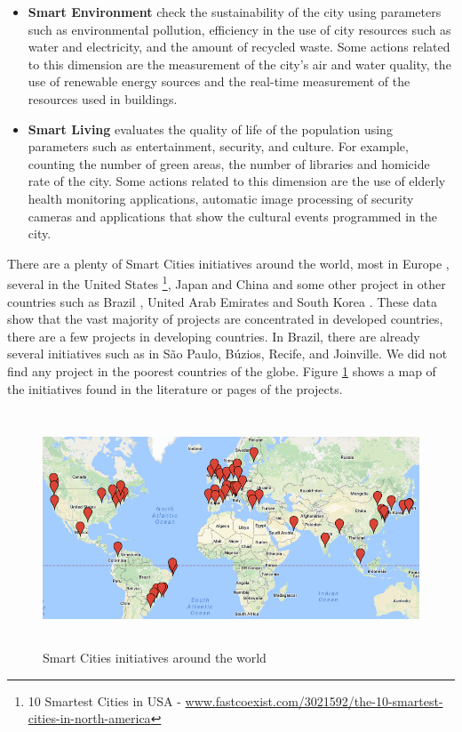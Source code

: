 \begin{itemize}
    \item \textbf{Smart Environment} check the sustainability of the city using parameters such as environmental pollution, efficiency in the use of city resources such as water and electricity, and the amount of recycled waste. Some actions related to this dimension are the measurement of the city's air and water quality, the use of renewable energy sources and the real-time measurement of the resources used in buildings.
    
    \item \textbf{Smart Living} evaluates the quality of life of the population using parameters such as entertainment, security, and culture. For example, counting the number of green areas, the number of libraries and homicide rate of the city. Some actions related to this dimension are the use of elderly health monitoring applications, automatic image processing of security cameras and applications that show the cultural events programmed in the city.

    
\end{itemize}

There are a plenty of Smart Cities initiatives around the world, most in Europe \citep{caragliu2011smart,manville2014mapping}, several in the United States \footnote{10 Smartest Cities in USA - \url{www.fastcoexist.com/3021592/the-10-smartest-cities-in-north-america}}, Japan and China \citep{liu2013smart} and some other project in other countries such as Brazil \citep{fortes2014deployment}, United Arab Emirates \citep{janajreh2013wind} and South Korea \citep{kshetri2014development}. These data show that the vast majority of projects are concentrated in developed countries, there are a few projects in developing countries. In Brazil, there are already several initiatives such as in S\~ao Paulo, B\'uzios, Recife, and Joinville. We did not find any project in the poorest countries of the globe. Figure \ref{figure:mapa} shows a map of the initiatives found in the literature or pages of the projects.

\begin{figure}[!htb]
\centering
\includegraphics[height=7cm]{figuras/mapaCidades}
\caption{Smart Cities initiatives around the world}
\label{figure:mapa}
\end{figure}

